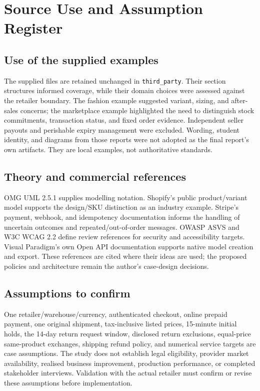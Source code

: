 \chapter{Source Use and Assumption Register}
\section{Use of the supplied examples}
The supplied files are retained unchanged in \texttt{third\_party}. Their section structures informed coverage, while their domain choices were assessed against the retailer boundary. The fashion example suggested variant, sizing, and after-sales concerns; the marketplace example highlighted the need to distinguish stock commitments, transaction status, and fixed order evidence. Independent seller payouts and perishable expiry management were excluded. Wording, student identity, and diagrams from those reports were not adopted as the final report's own artifacts. They are local examples, not authoritative standards.

\section{Theory and commercial references}
OMG UML 2.5.1 supplies modelling notation. Shopify's public product/variant model supports the design/SKU distinction as an industry example. Stripe's payment, webhook, and idempotency documentation informs the handling of uncertain outcomes and repeated/out-of-order messages. OWASP ASVS and W3C WCAG 2.2 define review references for security and accessibility targets. Visual Paradigm's own Open API documentation supports native model creation and export. These references are cited where their ideas are used; the proposed policies and architecture remain the author's case-design decisions.

\section{Assumptions to confirm}
One retailer/warehouse/currency, authenticated checkout, online prepaid payment, one original shipment, tax-inclusive listed prices, 15-minute initial holds, the 14-day return request window, disclosed return exclusions, equal-price same-product exchanges, shipping refund policy, and numerical service targets are case assumptions. The study does not establish legal eligibility, provider market availability, realised business improvement, production performance, or completed stakeholder interviews. Validation with the actual retailer must confirm or revise these assumptions before implementation.
